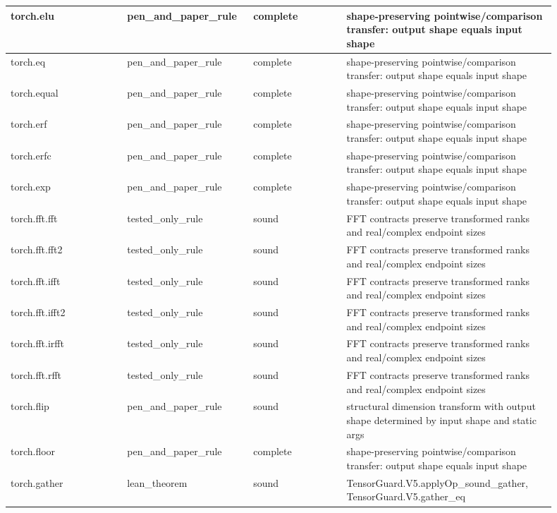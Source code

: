 \documentclass[10pt]{article}
\begin{document}
\begin{longtable}{|p{0.20\linewidth}|p{0.18\linewidth}|p{0.16\linewidth}|p{0.36\linewidth}|}
\hline
torch.elu & pen\_and\_paper\_rule & complete & shape-preserving pointwise/comparison transfer: output shape equals input shape \\
\hline
torch.eq & pen\_and\_paper\_rule & complete & shape-preserving pointwise/comparison transfer: output shape equals input shape \\
\hline
torch.equal & pen\_and\_paper\_rule & complete & shape-preserving pointwise/comparison transfer: output shape equals input shape \\
\hline
torch.erf & pen\_and\_paper\_rule & complete & shape-preserving pointwise/comparison transfer: output shape equals input shape \\
\hline
torch.erfc & pen\_and\_paper\_rule & complete & shape-preserving pointwise/comparison transfer: output shape equals input shape \\
\hline
torch.exp & pen\_and\_paper\_rule & complete & shape-preserving pointwise/comparison transfer: output shape equals input shape \\
\hline
torch.fft.fft & tested\_only\_rule & sound & FFT contracts preserve transformed ranks and real/complex endpoint sizes \\
\hline
torch.fft.fft2 & tested\_only\_rule & sound & FFT contracts preserve transformed ranks and real/complex endpoint sizes \\
\hline
torch.fft.ifft & tested\_only\_rule & sound & FFT contracts preserve transformed ranks and real/complex endpoint sizes \\
\hline
torch.fft.ifft2 & tested\_only\_rule & sound & FFT contracts preserve transformed ranks and real/complex endpoint sizes \\
\hline
torch.fft.irfft & tested\_only\_rule & sound & FFT contracts preserve transformed ranks and real/complex endpoint sizes \\
\hline
torch.fft.rfft & tested\_only\_rule & sound & FFT contracts preserve transformed ranks and real/complex endpoint sizes \\
\hline
torch.flip & pen\_and\_paper\_rule & sound & structural dimension transform with output shape determined by input shape and static args \\
\hline
torch.floor & pen\_and\_paper\_rule & complete & shape-preserving pointwise/comparison transfer: output shape equals input shape \\
\hline
torch.gather & lean\_theorem & sound & TensorGuard.V5.applyOp\_sound\_gather, TensorGuard.V5.gather\_eq \\
\hline

\end{longtable}
\end{document}
